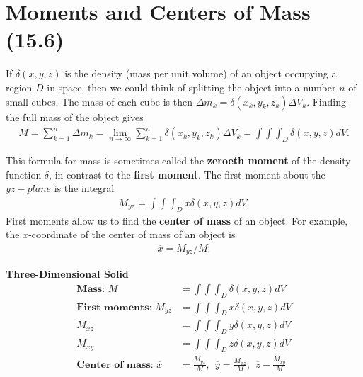 \documentclass[12pt, letter]{article}
\theoremstyle{plain}
\numberwithin{theorem}{section}
\theoremstyle{definition}
\begin{document}

\newpage


\section{Moments and Centers of Mass (15.6)}

If $\delta(x,y,z)$ is the density (mass per unit volume) of an object occupying a region $D$ in space, then we could think of splitting the object into a number $n$ of small cubes. The mass of each cube is then $\Delta m_k = \delta(x_k,y_k,z_k) \Delta V_k$. Finding the full mass of the object gives
\begin{align*}
M = \sum_{k=1}^n \Delta m_k = \lim_{n\to\infty} \sum_{k=1}^n \delta (x_k,y_k,z_k) \Delta V_k = \int \int \int_D \delta(x,y,z)dV.
\end{align*}

\bigskip

\hrulefill

\bigskip

This formula for mass is sometimes called the \textbf{zeroeth moment} of the density function $\delta$, in contrast to the \textbf{first moment}. The first moment about the ${yz}-plane$ is the integral
\begin{align*}
M_{yz} = \int \int \int_D x\delta(x,y,z)dV.
\end{align*}
First moments allow us to find the \textbf{center of mass} of an object. For example, the $x$-coordinate of the center of mass of an object is
\begin{align*}
\overline{x} = M_{yz}/M.
\end{align*}

\bigskip

\hrulefill

\bigskip

\textbf{Three-Dimensional Solid}
\begin{align*}
\textbf{Mass: } M&=\int\int\int_D \delta(x,y,z) dV\\
\textbf{First moments: } M_{yz} &= \int \int \int_D x\delta(x,y,z)dV\\ M_{xz} &= \int \int \int_D y\delta(x,y,z)dV\\ M_{xy} &= \int \int \int_D z\delta(x,y,z)dV\\
\textbf{Center of mass: } \overline{x} &= \frac{M_{yz}}{M}, \ \ \overline{y} = \frac{M_{xz}}{M}, \ \ \overline{z} - \frac{M_{xy}}{M}
\end{align*}
\end{document}
